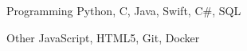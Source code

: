 


\begin{cvskills}


\cvskill
{Programming} %
{Python, C, Java, Swift, C\#, SQL} %


\cvskill
{Other} %
{JavaScript, HTML5, Git, Docker} %



\end{cvskills}
